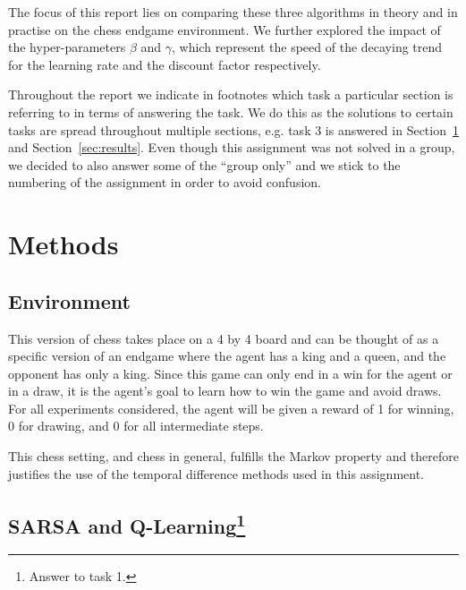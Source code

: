\documentclass[conference]{IEEEtran}
\begin{document}
The focus of this report lies on comparing these three algorithms in theory and in practise on the chess endgame environment. We further explored the impact of the hyper-parameters $\beta$ and $\gamma$, which represent the speed of the decaying trend for the learning rate and the discount factor respectively.


Throughout the report we indicate in footnotes which task a particular section is referring to in terms of answering the task. We do this as the solutions to certain tasks are spread throughout multiple sections, e.g. task 3 is answered in Section~\ref{sec:methods} and Section~\ref{sec:results}. Even though this assignment was not solved in a group, we decided to also answer some of the ``group only'' and we stick to the numbering of the assignment in order to avoid confusion.



\section{Methods}\label{sec:methods}


\subsection{Environment}

This version of chess takes place on a 4 by 4 board and can be thought of as a specific version of an endgame where the agent has a king and a queen, and the opponent has only a king. Since this game can only end in a win for the agent or in a draw, it is the agent's goal to learn how to win the game and avoid draws. For all experiments considered, the agent will be given a reward of 1 for winning, 0 for drawing, and 0 for all intermediate steps.

This chess setting, and chess in general, fulfills the Markov property and therefore justifies the use of the temporal difference methods used in this assignment.




\subsection{SARSA and Q-Learning\footnote{Answer to task 1.}}
\end{document}
